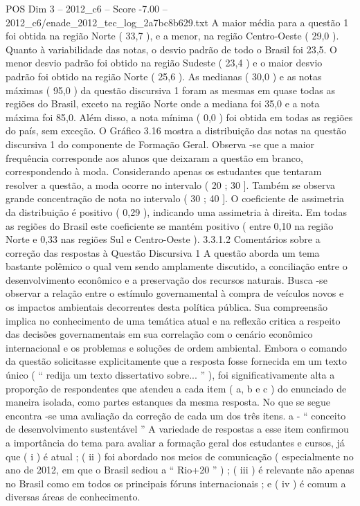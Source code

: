 \begin{textsample}{POS Dim 3 – 2012\_c6 – Score -7.00 – 2012\_c6/enade\_2012\_tec\_log\_2a7bc8b629.txt}
A maior média para a questão 1 foi obtida na região Norte ( 33,7 ), e a menor, na região Centro-Oeste ( 29,0 ).
Quanto à variabilidade das notas, o desvio padrão de todo o Brasil foi 23,5.
O menor desvio padrão foi obtido na região Sudeste ( 23,4 ) e o maior desvio padrão foi obtido na região Norte ( 25,6 ).
As medianas ( 30,0 ) e as notas máximas ( 95,0 ) da questão discursiva 1 foram as mesmas em quase todas as regiões do Brasil, exceto na região Norte onde a mediana foi 35,0 e a nota máxima foi 85,0.
Além disso, a nota mínima ( 0,0 ) foi obtida em todas as regiões do país, sem exceção.
O Gráfico 3.16 mostra a distribuição das notas na questão discursiva 1 do componente de Formação Geral.
Observa -se que a maior frequência corresponde aos alunos que deixaram a questão em branco, correspondendo à moda.
Considerando apenas os estudantes que tentaram resolver a questão, a moda ocorre no intervalo ( 20 ; 30 ].
Também se observa grande concentração de nota no intervalo ( 30 ; 40 ].
O coeficiente de assimetria da distribuição é positivo ( 0,29 ), indicando uma assimetria à direita.
Em todas as regiões do Brasil este coeficiente se mantém positivo ( entre 0,10 na região Norte e 0,33 nas regiões Sul e Centro-Oeste ). 3.3.1.2 Comentários sobre a correção das respostas à Questão Discursiva 1 A questão aborda um tema bastante polêmico o qual vem sendo amplamente discutido, a conciliação entre o desenvolvimento econômico e a preservação dos recursos naturais.
Busca -se observar a relação entre o estímulo governamental à compra de veículos novos e os impactos ambientais decorrentes desta política pública.
Sua compreensão implica no conhecimento de uma temática atual e na reflexão critica a respeito das decisões governamentais em sua correlação com o cenário econômico internacional e os problemas e soluções de ordem ambiental.
Embora o comando da questão solicitasse explicitamente que a resposta fosse fornecida em um texto único ( “ redija um texto dissertativo sobre... ” ), foi significativamente alta a proporção de respondentes que atendeu a cada item ( a, b e c ) do enunciado de maneira isolada, como partes estanques da mesma resposta.
No que se segue encontra -se uma avaliação da correção de cada um dos três itens. a - “ conceito de desenvolvimento sustentável ” A variedade de respostas a esse item confirmou a importância do tema para avaliar a formação geral dos estudantes e cursos, já que ( i ) é atual ; ( ii ) foi abordado nos meios de comunicação ( especialmente no ano de 2012, em que o Brasil sediou a “ Rio+20 ” ) ; ( iii ) é relevante não apenas no Brasil como em todos os principais fóruns internacionais ; e ( iv ) é comum a diversas áreas de conhecimento.

\end{textsample}
